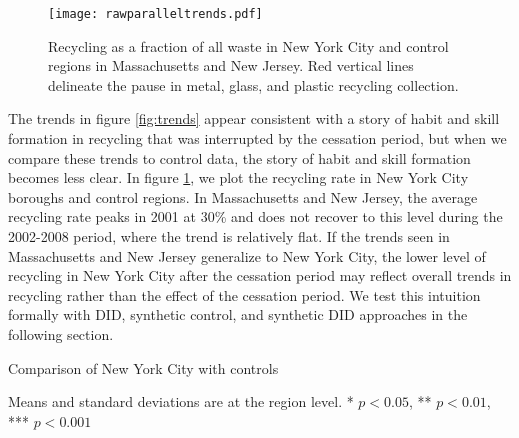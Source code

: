 \documentclass[12pt]{article}
\begin{document}
\begin{figure}
    \centering
    \texttt{[image: rawparalleltrends.pdf]}
    \caption{Recycling as a fraction of all waste in New York City and control regions in Massachusetts and New Jersey. Red vertical lines delineate the pause in metal, glass, and plastic recycling collection.}
    \label{fig:rawparalleltrends}
\end{figure}

The trends in figure \ref{fig:trends} appear consistent with a story of habit and skill formation in recycling that was interrupted by the cessation period, but when we compare these trends to control data, the story of habit and skill formation becomes less clear.  In figure \ref{fig:rawparalleltrends}, we plot the recycling rate in New York City boroughs and control regions.  In Massachusetts and New Jersey, the average recycling rate peaks in 2001 at 30\% and does not recover to this level during the 2002-2008 period, where the trend is relatively flat.  If the trends seen in Massachusetts and New Jersey generalize to New York City, the lower level of recycling in New York City after the cessation period may reflect overall trends in recycling rather than the effect of the cessation period.  We test this intuition formally with DID, synthetic control, and synthetic DID approaches in the following section.

\begin{table}
    \centering
    \begin{threeparttable}
    \caption{Comparison of New York City with controls}
    \label{tab:differenceinmeans}
    
    \begin{tablenotes}[flushleft]
    \scriptsize{Means and standard deviations are at the region level.  * \(p<0.05\), ** \(p<0.01\), *** \(p<0.001\)}
    \end{tablenotes}
    \end{threeparttable}
\end{table}
\end{document}
